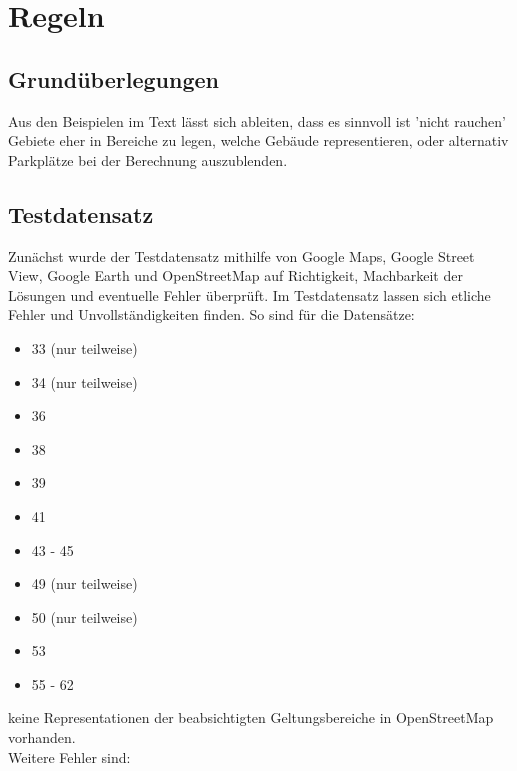\section{Regeln}

\subsection{Grundüberlegungen}
Aus den Beispielen im Text lässt sich ableiten, dass es sinnvoll ist 'nicht rauchen' Gebiete eher in Bereiche zu legen, welche Gebäude representieren,
oder alternativ Parkplätze bei der Berechnung auszublenden.

\subsection{Testdatensatz}
Zunächst wurde der Testdatensatz mithilfe von Google Maps, Google Street View, Google Earth und OpenStreetMap auf Richtigkeit, Machbarkeit der Lösungen und eventuelle Fehler überprüft.
Im Testdatensatz lassen sich etliche Fehler und Unvollständigkeiten finden. So sind für die Datensätze:
\begin{itemize}
\item 33 (nur teilweise)
\item 34 (nur teilweise)
\item 36
\item 38
\item 39
\item 41
\item 43 - 45
\item 49 (nur teilweise)
\item 50 (nur teilweise)
\item 53
\item 55 - 62
\end{itemize}
keine Representationen der beabsichtigten Geltungsbereiche in OpenStreetMap vorhanden.
\newline
\\
Weitere Fehler sind:
